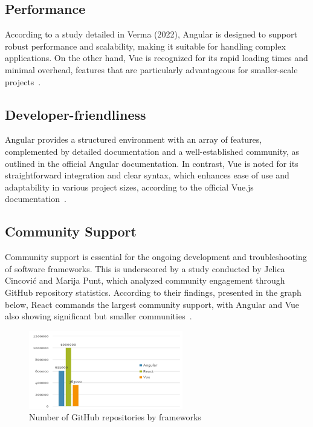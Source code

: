 \subsection{Performance}
According to a study detailed in Verma (2022), Angular is designed to support robust performance and scalability, making it suitable for handling complex applications. On the other hand, Vue is recognized for its rapid loading times and minimal overhead, features that are particularly advantageous for smaller-scale projects~\cite{verma2022comparison}.

\subsection{Developer-friendliness}
Angular provides a structured environment with an array of features, complemented by detailed documentation and a well-established community, as outlined in the official Angular documentation. In contrast, Vue is noted for its straightforward integration and clear syntax, which enhances ease of use and adaptability in various project sizes, according to the official Vue.js documentation~\cite{angular, vue}.

\subsection{Community Support}
Community support is essential for the ongoing development and troubleshooting of software frameworks. This is underscored by a study conducted by Jelica Cincović and Marija Punt, which analyzed community engagement through GitHub repository statistics. According to their findings, presented in the graph below, React commands the largest community support, with Angular and Vue also showing significant but smaller communities~\cite{cincovic2020comparison}.

\begin{figure}[h!]
    \centering
    \includegraphics[width=0.6\textwidth]{image.png}
    \caption{Number of GitHub repositories by frameworks~\cite{cincovic2020comparison}}
    \label{fig:github_repos}
\end{figure}
    
